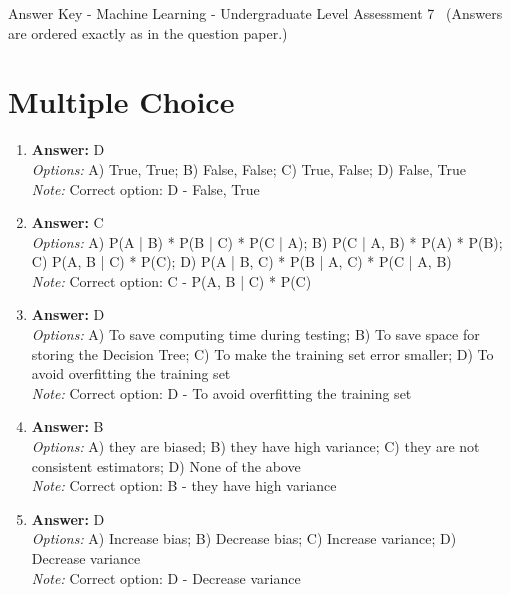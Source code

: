 \documentclass[12pt]{article}
\begin{document}
\begin{center}
Answer Key - Machine Learning - Undergraduate Level Assessment 7 \
\small (Answers are ordered exactly as in the question paper.)
\end{center}

\section*{Multiple Choice}
\begin{enumerate}[label=\arabic*.]
\item \textbf{Answer:} D
\\ \textit{Options:} A) True, True; B) False, False; C) True, False; D) False, True
\\ \textit{Note:} Correct option: D - False, True
\item \textbf{Answer:} C
\\ \textit{Options:} A) P(A | B) * P(B | C) * P(C | A); B) P(C | A, B) * P(A) * P(B); C) P(A, B | C) * P(C); D) P(A | B, C) * P(B | A, C) * P(C | A, B)
\\ \textit{Note:} Correct option: C - P(A, B | C) * P(C)
\item \textbf{Answer:} D
\\ \textit{Options:} A) To save computing time during testing; B) To save space for storing the Decision Tree; C) To make the training set error smaller; D) To avoid overfitting the training set
\\ \textit{Note:} Correct option: D - To avoid overfitting the training set
\item \textbf{Answer:} B
\\ \textit{Options:} A) they are biased; B) they have high variance; C) they are not consistent estimators; D) None of the above
\\ \textit{Note:} Correct option: B - they have high variance
\item \textbf{Answer:} D
\\ \textit{Options:} A) Increase bias; B) Decrease bias; C) Increase variance; D) Decrease variance
\\ \textit{Note:} Correct option: D - Decrease variance
\end{enumerate}
\end{document}
